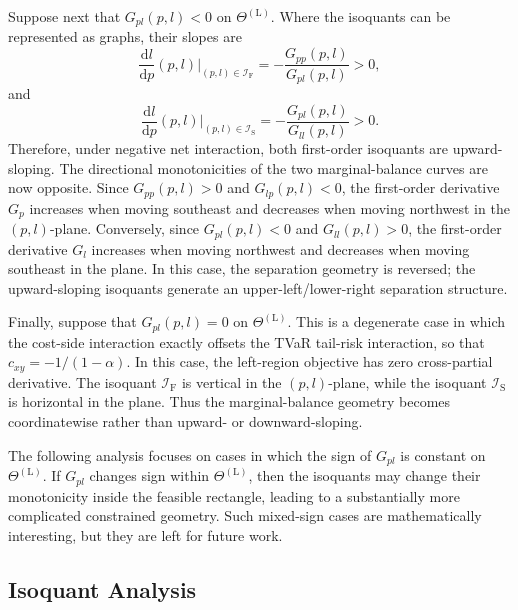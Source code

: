 \documentclass[a4paper,12pt]{article}
\begin{document}
Suppose next that $G_{pl}\left(p,l\right)<0$ on $\Theta^{\left(\text{L}\right)}$. Where the isoquants can be represented as graphs, their slopes are
\begin{equation*}
\frac{\text{d}l}{\text{d}p}\left(p,l\right)\bigg\vert_{\left(p,l\right)\in\mathcal{I}_{\text{F}}}=-\frac{G_{pp}\left(p,l\right)}{G_{pl}\left(p,l\right)}>0,
\end{equation*}
and
\begin{equation*}
\frac{\text{d}l}{\text{d}p}\left(p,l\right)\bigg\vert_{\left(p,l\right)\in\mathcal{I}_{\text{S}}}=-\frac{G_{pl}\left(p,l\right)}{G_{ll}\left(p,l\right)}>0.
\end{equation*}
Therefore, under negative net interaction, both first-order isoquants are upward-sloping. The directional monotonicities of the two marginal-balance curves are now opposite. Since $G_{pp}\left(p,l\right)>0$ and $G_{lp}\left(p,l\right)<0$, the first-order derivative $G_p$ increases when moving southeast and decreases when moving northwest in the $\left(p,l\right)$-plane. Conversely, since $G_{pl}\left(p,l\right)<0$ and $G_{ll}\left(p,l\right)>0$, the first-order derivative $G_l$ increases when moving northwest and decreases when moving southeast in the plane. In this case, the separation geometry is reversed; the upward-sloping isoquants generate an upper-left/lower-right separation structure.

Finally, suppose that $G_{pl}\left(p,l\right)=0$ on $\Theta^{\left(\text{L}\right)}$. This is a degenerate case in which the cost-side interaction exactly offsets the TVaR tail-risk interaction, so that $c_{xy}=-1/\left(1-\alpha\right)$. In this case, the left-region objective has zero cross-partial derivative. The isoquant $\mathcal{I}_{\text{F}}$ is vertical in the $\left(p,l\right)$-plane, while the isoquant $\mathcal{I}_{\text{S}}$ is horizontal in the plane. Thus the marginal-balance geometry becomes coordinatewise rather than upward- or downward-sloping.

The following analysis focuses on cases in which the sign of $G_{pl}$ is constant on $\Theta^{\left(\text{L}\right)}$. If $G_{pl}$ changes sign within $\Theta^{\left(\text{L}\right)}$, then the isoquants may change their monotonicity inside the feasible rectangle, leading to a substantially more complicated constrained geometry. Such mixed-sign cases are mathematically interesting, but they are left for future work.

\subsection{Isoquant Analysis}
\end{document}
